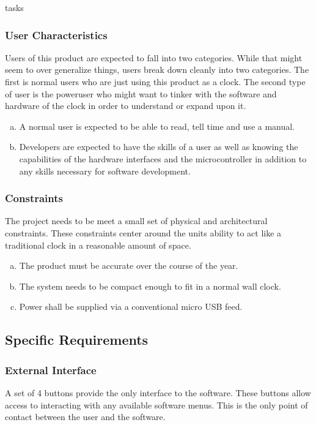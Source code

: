 tasks\documentclass[onecolumn, draftclsnofoot,10pt, compsoc]{IEEEtran}
\begin{document}
\subsubsection{User Characteristics}
Users of this product are expected to fall into two categories. While that might
seem to over generalize things, users break down cleanly into two categories.
The first is normal users who are just using this product as a clock. The second
type of user is the poweruser who might want to tinker with the software and
hardware of the clock in order to understand or expand upon it.
\begin{enumerate}[a)]
  \item A normal user is expected to be able to read, tell time and use a manual.
  \item Developers are expected to have the skills of a user as well as knowing the
capabilities of the hardware interfaces and the microcontroller in addition to
any skills necessary for software development.
\end{enumerate}

\subsubsection{Constraints}
The project needs to be meet a small set of physical and architectural constraints. These
constraints center around the units ability to act like a traditional clock in a reasonable
amount of space.
\begin{enumerate}[a)]
  \item The product must be accurate over the course of the year.
  \item The system needs to be compact enough to fit in a normal wall clock.
  \item Power shall be supplied via a conventional micro USB feed.
\end{enumerate}

\subsection{Specific Requirements}
\subsubsection{External Interface}
A set of 4 buttons provide the only interface to the software. These buttons
allow access to interacting with any available software menus. This is the only
point of contact between the user and the software.
\end{document}
